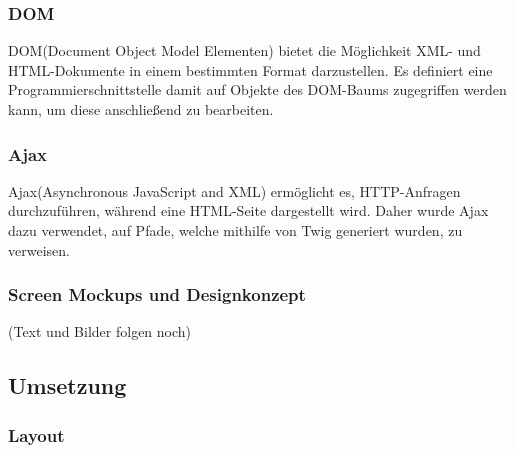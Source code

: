     
    \subsubsection{DOM}

	DOM(Document Object Model Elementen) bietet die Möglichkeit XML- und HTML-Dokumente in einem bestimmten Format darzustellen. Es definiert eine Programmierschnittstelle damit auf Objekte des DOM-Baums zugegriffen werden kann, um diese anschließend zu bearbeiten.

    \subsubsection{Ajax}

	Ajax(Asynchronous JavaScript and XML) ermöglicht es, HTTP-Anfragen durchzuführen, während eine HTML-Seite dargestellt wird. Daher wurde Ajax dazu verwendet, auf Pfade, welche mithilfe von Twig generiert wurden, zu verweisen.

    \subsubsection{Screen Mockups und Designkonzept}

	(Text und Bilder folgen noch)

  \subsection{Umsetzung}

    \subsubsection{Layout}

